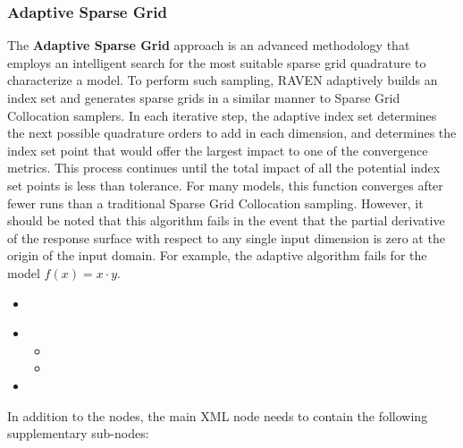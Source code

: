 \subsubsection{Adaptive Sparse Grid}
\label{subsubsubsec:AdaptiveSparseGrid}
The \textbf{Adaptive Sparse Grid} approach is an advanced methodology that employs
an intelligent search for the most suitable sparse grid quadrature to characterize a model.
%
To perform such sampling, RAVEN adaptively builds an index set and generates sparse grids
in a similar manner to Sparse Grid Collocation samplers.  In each iterative step, the adaptive
index set determines the next possible quadrature orders to add in each dimension, and
determines the index set point that would offer the largest impact to one of the convergence
metrics.  This process continues until the total impact of all the potential index set points is
less than tolerance.  For many models, this function converges after fewer runs than a traditional
Sparse Grid Collocation sampling.  However, it should be noted that this algorithm fails
in the event that the partial derivative of the response surface with respect to any single
input dimension is zero at the origin of the input domain.  For example, the adaptive
algorithm fails for the model $f(x)=x\cdot y$.
%

%
\attrIntro

\begin{itemize}
  \itemsep0em
  \item \nameDescription
\end{itemize}


\begin{itemize}
  \item \variableDescription
    \variableChildrenIntro
    \begin{itemize}
      \item \distributionDescription
    \item \functionDescription
    \end{itemize}
    \item \constantVariablesDescription
\end{itemize}

In addition to the  nodes, the main XML node
 needs to contain the following supplementary sub-nodes:

